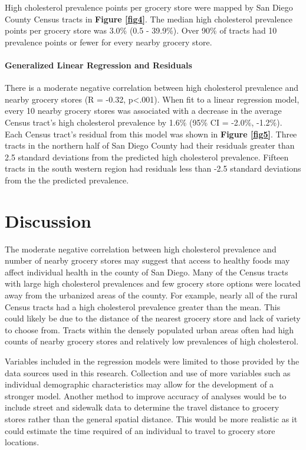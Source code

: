 \documentclass[]{elsarticle} %
\begin{document}
High cholesterol prevalence points per grocery store were mapped by San
Diego County Census tracts in \textbf{Figure \ref{fig4}}. The median
high cholesterol prevalence points per grocery store was 3.0\% (0.5 -
39.9\%). Over 90\% of tracts had 10 prevalence points or fewer for every
nearby grocery store.

\hypertarget{generalized-linear-regression-and-residuals}{%
\paragraph{Generalized Linear Regression and
Residuals}\label{generalized-linear-regression-and-residuals}}

There is a moderate negative correlation between high cholesterol
prevalence and nearby grocery stores (R = -0.32, p\textless.001). When
fit to a linear regression model, every 10 nearby grocery stores was
associated with a decrease in the average Census tract's high
cholesterol prevalence by 1.6\% (95\% CI = -2.0\%, -1.2\%). Each Census
tract's residual from this model was shown in \textbf{Figure
\ref{fig5}}. Three tracts in the northern half of San Diego County had
their residuals greater than 2.5 standard deviations from the predicted
high cholesterol prevalence. Fifteen tracts in the south western region
had residuals less than -2.5 standard deviations from the the predicted
prevalence.

\hypertarget{discussion}{%
\section{Discussion}\label{discussion}}

The moderate negative correlation between high cholesterol prevalence
and number of nearby grocery stores may suggest that access to healthy
foods may affect individual health in the county of San Diego. Many of
the Census tracts with large high cholesterol prevalences and few
grocery store options were located away from the urbanized areas of the
county. For example, nearly all of the rural Census tracts had a high
cholesterol prevalence greater than the mean. This could likely be due
to the distance of the nearest grocery store and lack of variety to
choose from. Tracts within the densely populated urban areas often had
high counts of nearby grocery stores and relatively low prevalences of
high cholesterol.

Variables included in the regression models were limited to those
provided by the data sources used in this research. Collection and use
of more variables such as individual demographic characteristics may
allow for the development of a stronger model. Another method to improve
accuracy of analyses would be to include street and sidewalk data to
determine the travel distance to grocery stores rather than the general
spatial distance. This would be more realistic as it could estimate the
time required of an individual to travel to grocery store locations.
\end{document}
